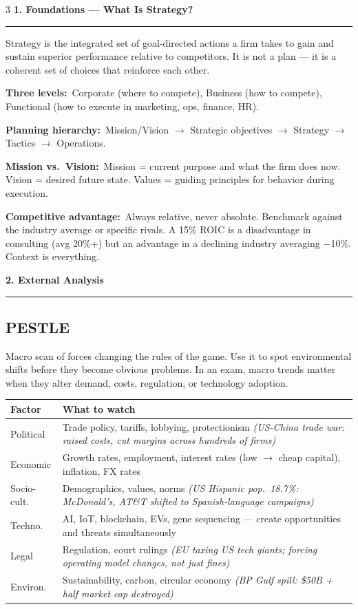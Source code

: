 \documentclass[7.6pt,letterpaper]{article}
\newcommand{\secbar}[1]{%
    \vspace{2pt}\noindent\textbf{#1}\par\vspace{1pt}\hrule\vspace{2pt}%
  }
\newcommand{\secbar}[1]{%
    \vspace{3pt}%
    \noindent\colorbox{navy}{\parbox{\dimexpr\linewidth-2\fboxsep}{%
      \fontsize{6.8pt}{8pt}\sffamily\bfseries\color{white}\strut\ #1\strut}}%
    \vspace{1pt}\par%
  }
\newcommand{\T}[1]{\textbf{\color{navy}#1}}
\newcommand{\kk}[2]{\noindent\T{#1}\ #2\par}
\newcommand{\eg}[1]{\textit{\color{mid}#1}}
\newcommand{\sh}{\rowcolor{strip}}
\newcommand{\ctab}[1]{{\fontsize{6.2pt}{7pt}\selectfont\setlength{\tabcolsep}{2.5pt}#1}}
\begin{document}
\begin{multicols}{3}
\secbar{1. Foundations — What Is Strategy?}

Strategy is the integrated set of goal-directed actions a firm takes to gain and sustain superior performance relative to competitors. It is not a plan --- it is a coherent set of choices that reinforce each other.

\kk{Three levels:}{Corporate (where to compete), Business (how to compete), Functional (how to execute in marketing, ops, finance, HR).}

\kk{Planning hierarchy:}{Mission/Vision $\to$ Strategic objectives $\to$ Strategy $\to$ Tactics $\to$ Operations.}

\kk{Mission vs.\ Vision:}{Mission = current purpose and what the firm does now. Vision = desired future state. Values = guiding principles for behavior during execution.}

\kk{Competitive advantage:}{Always relative, never absolute. Benchmark against the industry average or specific rivals. A 15\% ROIC is a disadvantage in consulting (avg 20\%+) but an advantage in a declining industry averaging $-$10\%. Context is everything.}

\secbar{2. External Analysis}

\subsection{PESTLE}

Macro scan of forces changing the rules of the game. Use it to spot environmental shifts before they become obvious problems. In an exam, macro trends matter when they alter demand, costs, regulation, or technology adoption.

\ctab{\begin{tabular}{@{}p{1.0cm}p{4.8cm}@{}}
\toprule
\sh \T{Factor} & \T{What to watch} \\
\midrule
Political & Trade policy, tariffs, lobbying, protectionism \eg{(US-China trade war: raised costs, cut margins across hundreds of firms)} \\
Economic & Growth rates, employment, interest rates (low $\to$ cheap capital), inflation, FX rates \\
Socio-cult. & Demographics, values, norms \eg{(US Hispanic pop.\ 18.7\%: McDonald's, AT\&T shifted to Spanish-language campaigns)} \\
Techno. & AI, IoT, blockchain, EVs, gene sequencing --- create opportunities and threats simultaneously \\
Legal & Regulation, court rulings \eg{(EU taxing US tech giants; forcing operating model changes, not just fines)} \\
Environ. & Sustainability, carbon, circular economy \eg{(BP Gulf spill: \$50B + half market cap destroyed)} \\
\bottomrule
\end{tabular}}


\end{multicols}
\end{document}
